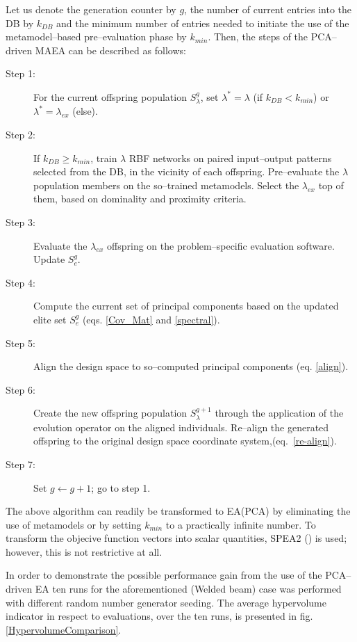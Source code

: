 Let us denote the generation counter by $g$, the number of current entries into the DB by $k_{DB}$ and the minimum number of entries needed to initiate the use of the metamodel--based pre--evaluation phase by $k_{min}$. Then, the steps of the PCA--driven MAEA can be described as follows:
\begin{description}
  \item[Step 1:] For the current offspring population $S^{g}_\lambda$, set $\lambda^*\!=\!\lambda$ (if $k_{DB}\!<\!k_{min}$) or  $\lambda^*\!=\!\lambda_{ex}$ (else). 
  \item[Step 2:] If $k_{DB}\!\ge\!k_{min}$, train $\lambda$ RBF networks on paired input--output patterns selected from the DB, in the vicinity of each offspring. Pre--evaluate the $\lambda$ population members on the so--trained metamodels. Select the $\lambda_{ex}$ top of them, based on dominality and proximity criteria.
  \item[Step 3:] Evaluate the $\lambda_{ex}$ offspring on the problem--specific evaluation software. Update $S^{g}_e$.
  \item[Step 4:] Compute the current set of principal components based on the updated elite set $S^{g}_e$ (eqs. \ref{Cov_Mat} and \ref{spectral}).
  \item[Step 5:] Align the design space to so--computed principal components (eq. \ref{align}). 
  \item[Step 6:] Create the new offspring population $S^{g+1}_\lambda$ through the application of the evolution operator on the aligned individuals. Re--align the generated offspring to the original design space coordinate system,(eq.~\ref{re-align}).
  \item[Step 7:] Set $g\!\leftarrow\!g\!+\!1$; go to step 1.
\end{description}
The above algorithm can readily be transformed to EA(PCA) by eliminating the use of metamodels or by setting $k_{min}$ to a practically infinite number.  To transform the objecive function vectors into scalar quantities, SPEA2 (\cite{kn:Zitz02}) is used; however, this is not restrictive at all.

In order to demonstrate the possible performance gain from the use of the PCA--driven EA ten runs for the aforementioned (Welded beam) case was performed with different random number generator seeding. The average hypervolume indicator in respect to evaluations, over the ten runs, is presented in fig. \ref{HypervolumeComparison}.





